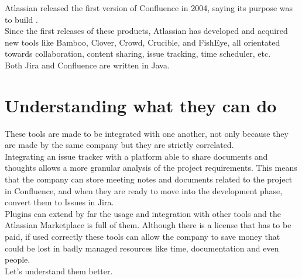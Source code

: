 	Atlassian released the first version of Confluence in 2004, saying its purpose was to build \cite{theserverside}.\\
	Since the first releases of these products, Atlassian has developed and acquired new tools like Bamboo, Clover, Crowd, Crucible, and FishEye, all orientated towards collaboration, content sharing, issue tracking, time scheduler, etc.\\
	Both Jira and Confluence are written in Java.

\section{Understanding what they can do}
	These tools are made to be integrated with one another, not only because they are made by the same company but they are strictly correlated.\\
	Integrating an issue tracker with a platform able to share documents and thoughts allows a more granular analysis of the project requirements.
	This means that the company can store meeting notes and documents related to the project in Confluence, and when they are ready to move into the development phase, convert them to Issues in Jira.\\
	Plugins can extend by far the usage and integration with other tools and the Atlassian Marketplace is full of them.
	Although there is a license that has to be paid, if used correctly these tools can allow the company to save money that could be lost in badly managed resources like time, documentation and even people.\\
	Let's understand them better.
